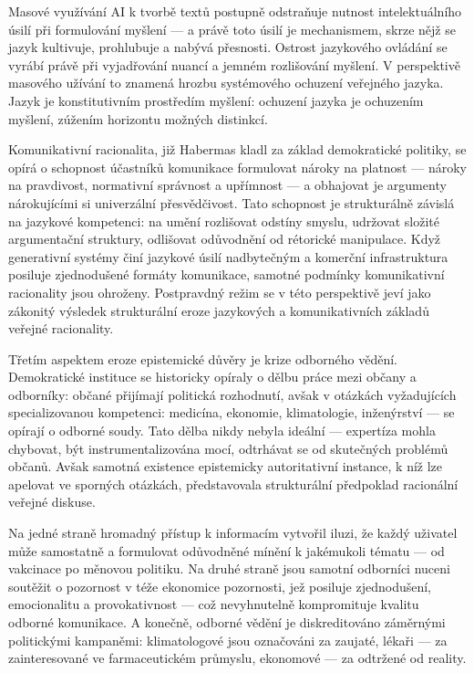 Masové využívání AI k tvorbě textů postupně odstraňuje nutnost intelektuálního úsilí při formulování myšlení — a právě toto úsilí je mechanismem, skrze nějž se jazyk kultivuje, prohlubuje a nabývá přesnosti. Ostrost jazykového ovládání se vyrábí právě při vyjadřování nuancí a jemném rozlišování myšlení. V perspektivě masového užívání to znamená hrozbu systémového ochuzení veřejného jazyka. Jazyk je konstitutivním prostředím myšlení: ochuzení jazyka je ochuzením myšlení, zúžením horizontu možných distinkcí.

Komunikativní racionalita, již Habermas kladl za základ demokratické politiky, se opírá o schopnost účastníků komunikace formulovat nároky na platnost — nároky na pravdivost, normativní správnost a upřímnost — a obhajovat je argumenty nárokujícími si univerzální přesvědčivost. Tato schopnost je strukturálně závislá na jazykové kompetenci: na umění rozlišovat odstíny smyslu, udržovat složité argumentační struktury, odlišovat odůvodnění od rétorické manipulace. Když generativní systémy činí jazykové úsilí nadbytečným a komerční infrastruktura posiluje zjednodušené formáty komunikace, samotné podmínky komunikativní racionality jsou ohroženy. Postpravdný režim se v této perspektivě jeví jako zákonitý výsledek strukturální eroze jazykových a komunikativních základů veřejné racionality.

Třetím aspektem eroze epistemické důvěry je krize odborného vědění. Demokratické instituce se historicky opíraly o dělbu práce mezi občany a odborníky: občané přijímají politická rozhodnutí, avšak v otázkách vyžadujících specializovanou kompetenci: medicína, ekonomie, klimatologie, inženýrství — se opírají o odborné soudy. Tato dělba nikdy nebyla ideální — expertíza mohla chybovat, být instrumentalizována mocí, odtrhávat se od skutečných problémů občanů. Avšak samotná existence epistemicky autoritativní instance, k níž lze apelovat ve sporných otázkách, představovala strukturální předpoklad racionální veřejné diskuse.

Na jedné straně hromadný přístup k informacím vytvořil iluzi, že každý uživatel může samostatně  a formulovat odůvodněné mínění k jakémukoli tématu — od vakcinace po měnovou politiku. Na druhé straně jsou samotní odborníci nuceni soutěžit o pozornost v téže ekonomice pozornosti, jež posiluje zjednodušení, emocionalitu a provokativnost — což nevyhnutelně kompromituje kvalitu odborné komunikace. A konečně, odborné vědění je diskreditováno záměrnými politickými kampaněmi: klimatologové jsou označováni za zaujaté, lékaři — za zainteresované ve farmaceutickém průmyslu, ekonomové — za odtržené od reality.


